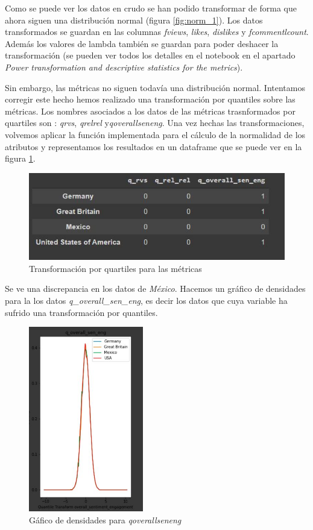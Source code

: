 \documentclass[a4paper,12pt]{article}
\begin{document}
Como se puede ver los datos en crudo se han podido transformar de forma que ahora siguen una distribuci\'on normal (figura \ref{fig:norm_1}). Los datos transformados se guardan en las columnas {\itshape fviews}, {\itshape likes}, {\itshape dislikes} y {\itshape fcommentl{\textunderscore}count}. Adem\'as los valores de lambda tambi\'en se guardan para poder deshacer la transformaci\'on (se pueden ver todos los detalles en el notebook en el apartado {\itshape Power transformation and descriptive statistics for the metrics}).

Sin embargo, las m\'etricas no siguen todav\'ia una distribuci\'on normal. Intentamos corregir este hecho hemos realizado una transformaci\'on por quantiles sobre las m\'etricas. Los nombres asociados a los datos de las m\'etricas trasnformados por quartiles son : {\itshape q{\textunderscore}rvs}, {\itshape q{\textunderscore}rel{\textunderscore}rel} y{\itshape q{\textunderscore}overall{\textunderscore}sen{\textunderscore}eng}. Una vez hechas las transformaciones, volvemos aplicar la funci\'on implementada para el c\'alculo de la normalidad de los atributos y representamos los resultados en un dataframe que se puede ver en la figura \ref{fig:quar}.

\begin{figure}[h!]
\centering
\includegraphics[width=12cm]{dataframe_3.JPG}
\caption{Transformaci\'on por quartiles para las m\'etricas}
\label{fig:quar}
\end{figure}

Se ve una discrepancia en los datos de {\itshape M\'exico}. Hacemos un gr\'afico de densidades para la los datos {\itshape q\_overall\_sen\_eng}, es decir los datos que cuya variable  ha sufrido una transformaci\'on por quantiles.

\begin{figure}[h!]
\centering
\includegraphics[width=5cm]{grafica_transformada.JPG}
\caption{G\'afico de densidades para {\itshape q{\textunderscore}overall{\textunderscore}sen{\textunderscore}eng}}
\label{fig:quart_2}
\end{figure}
\end{document}
